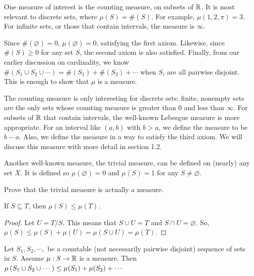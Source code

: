 One measure of interest is the counting measure, on subsets of $\mathbb{R}$. It is most relevant to discrete sets, where $\mu(S)=\#(S)$. For example, $\mu(1,2,\pi)=3$. For infinite sets, or those that contain intervals, the measure is $\infty$. 

\begin{example}
    Since $\#(\varnothing)=0$, $\mu(\varnothing)=0$, satisfying the first axiom. Likewise, since $\#(S)\geq0$ for any set $S$, the second axiom is also satisfied. Finally, from our earlier discussion on cardinality, we know $\#\left(S_1\cup S_2\cup\cdots\right)=\#(S_1)+\#(S_2)+\cdots$ when $S_i$ are all pairwise disjoint. This is enough to show that $\mu$ is a measure. 
\end{example}

The counting measure is only interesting for discrete sets; finite, nonempty sets are the only sets whose counting measure is greater than $0$ and less than $\infty$. For subsets of $\mathbb{R}$ that contain intervals, the well-known Lebesgue measure is more appropriate. For an interval like $(a,b)$ with $b>a$, we define the measure to be $b-a$. Also, we define the measure in a way to satisfy the third axiom. We will discuss this measure with more detail in section 1.2. \par

Another well-known measure, the trivial measure, can be defined on (nearly) any set $X$. It is defined so $\mu(\varnothing)=0$ and $\mu(S)=1$ for any $S\neq\varnothing$. 

\begin{exercise}
    Prove that the trivial measure is actually a measure. 
\end{exercise}

\begin{theorem}[Monotonicity]
    If $S\subseteq T$, then $\mu(S)\leq\mu(T)$.\par
    \begin{proof}
        Let $U=T / S$. This means that $S\cup U = T$ and $S\cap U = \varnothing$. \break So, $\mu(S)\leq\mu(S)+\mu(U)=\mu(S\cup U)=\mu(T)$. 
    \end{proof}
    
\end{theorem}

\begin{exercise}
    Let $S_1,S_2,\cdots,$ be a countable (not necessarily pairwise disjoint) sequence of sets in $S$. Assume $\mu: S\to \mathbb{R}$ is a measure. Then $\displaystyle \mu\left(S_1\cup S_2\cup \cdots \right)\leq \mu(S_1)+\mu(S_2)+\cdots$
\end{exercise}

